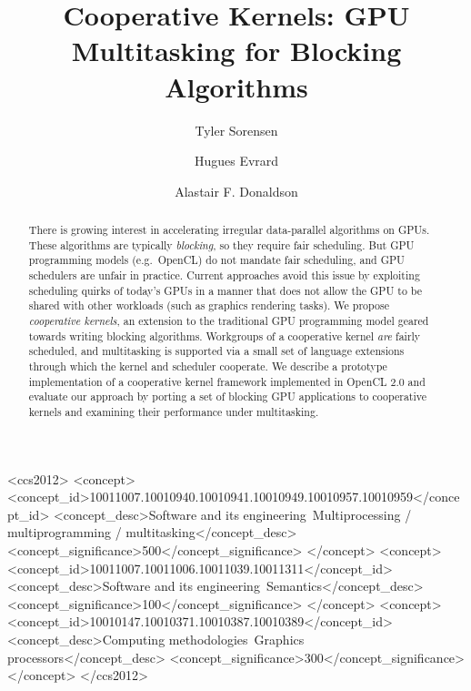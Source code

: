 \documentclass[sigconf]{acmart}
\begin{document}
\title{Cooperative Kernels: GPU Multitasking for Blocking Algorithms}

\author{Tyler Sorensen}

\author{Hugues Evrard}


\author{Alastair F. Donaldson}



\begin{abstract}
There is growing interest in accelerating irregular data-parallel
algorithms on GPUs.  These algorithms are typically \emph{blocking},
so they require fair scheduling.  But GPU programming models
(e.g.\ OpenCL) do not mandate fair scheduling, and GPU schedulers are
unfair in practice.  Current approaches avoid this issue by exploiting
scheduling quirks of today's GPUs in a manner that does not allow the
GPU to be shared with other workloads (such as graphics rendering
tasks).  We propose \emph{cooperative kernels}, an extension to the
traditional GPU programming model geared towards writing blocking
algorithms.  Workgroups of a cooperative kernel \emph{are} fairly
scheduled, and multitasking is supported via a small set of language
extensions through which the kernel and scheduler cooperate.  We
describe a prototype implementation of a cooperative kernel framework
implemented in OpenCL 2.0 and evaluate our approach by porting a set
of blocking GPU applications to cooperative kernels and examining
their performance under multitasking.  

\end{abstract}

\begin{CCSXML}
<ccs2012>
<concept>
<concept_id>10011007.10010940.10010941.10010949.10010957.10010959</concept_id>
<concept_desc>Software and its engineering~Multiprocessing / multiprogramming / multitasking</concept_desc>
<concept_significance>500</concept_significance>
</concept>
<concept>
<concept_id>10011007.10011006.10011039.10011311</concept_id>
<concept_desc>Software and its engineering~Semantics</concept_desc>
<concept_significance>100</concept_significance>
</concept>
<concept>
<concept_id>10010147.10010371.10010387.10010389</concept_id>
<concept_desc>Computing methodologies~Graphics processors</concept_desc>
<concept_significance>300</concept_significance>
</concept>
</ccs2012>
\end{CCSXML}
\end{document}
